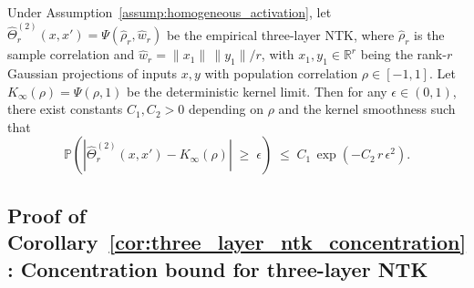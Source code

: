 \begin{corollary}\label{cor:three_layer_ntk_concentration}
Under Assumption~\ref{assump:homogeneous_activation}, let \( \hat{\Theta}^{(2)}_r(x,x') = \Psi(\hat{\rho}_r, \hat{w}_r) \) be the empirical three-layer NTK, where \( \hat{\rho}_r \) is the sample correlation and \( \hat{w}_r = \|x_1\|\,\|y_1\|/r \), with \( x_1, y_1 \in \mathbb{R}^r \) being the rank-\(r\) Gaussian projections of inputs \( x, y \) with population correlation \( \rho \in [-1,1] \). Let \( K_{\infty}(\rho) = \Psi(\rho,1) \) be the deterministic kernel limit.
Then for any \( \epsilon \in (0,1) \), there exist constants \( C_1, C_2 > 0 \) depending on \( \rho \) and the kernel smoothness such that
\[
\mathbb{P}\!\left(\left|\hat{\Theta}^{(2)}_r(x,x') - K_{\infty}(\rho)\right|\;\ge\;\epsilon\right)\;\le\;C_1\,\exp\!\left(-C_2\,r\,\epsilon^2\right).
\]
\end{corollary}

\subsection{Proof of Corollary~\ref{cor:three_layer_ntk_concentration}: Concentration bound for three-layer NTK}
\label{appendix:proof-three-layer-ntk-concentration}

